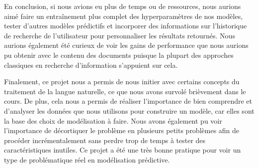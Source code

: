 En conclusion, si nous avions eu plus de temps ou de ressources, nous aurions aimé faire un entraînement plus complet des hyperparamètres de nos modèles, tester d'autres modèles prédictifs et incorporer des informations sur l'historique de recherche de l'utilisateur pour personnaliser les résultats retournés.
Nous aurions également été curieux de voir les gains de performance que nous aurions pu obtenir avec le contenu des documents puisque la plupart des approches classiques en recherche d'information s'appuient sur cela.
\break

Finalement, ce projet nous a permis de nous initier avec certains concepts du traitement de la langue naturelle, ce que nous avons survolé brièvement dans le cours. De plus, cela nous a permis de réaliser l'importance de bien comprendre et d'analyser les données que nous utilisons pour construire un modèle, car elles sont la base des choix de modélisation à faire. Nous avons également pu voir l'importance de décortiquer le problème en plusieurs petits problèmes afin de procéder incrémentalement sans perdre trop de temps à tester des caractéristiques inutiles. Ce projet a été une très bonne pratique pour voir un type de problématique réel en modélisation prédictive.
